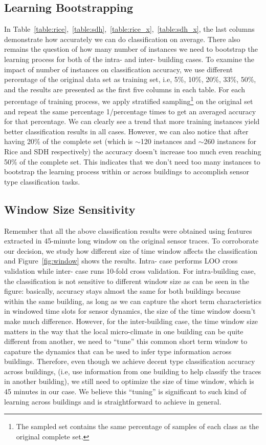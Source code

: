 \subsection{Learning Bootstrapping}
In Table~\ref{table:rice},~\ref{table:sdh},~\ref{table:rice_x},~\ref{table:sdh_x}, the last columns demonstrate how accurately we can do classification on average. There also remains the question of how many number of instances we need to bootstrap the learning process for both of the intra- and inter- building cases. To examine the impact of number of instances on classification accuracy, we use different percentage of the original data set as training set, i.e, 5\%, 10\%, 20\%, 33\%,
50\%, and the results are presented as the first five columns in each table. For each percentage of training process, we apply stratified sampling\footnote{The sampled set contains the same percentage of samples of each class as the original complete set.} on the original set and repeat the same percentage 1/percentage times to get an averaged accuracy for that percentage. We can clearly see a trend that more
training instances yield better classification results in all cases. However, we can also notice that after having 20\% of the complete set (which is $\sim$120 instances and $\sim$260 instances for Rice and SDH respectively) the accuracy doesn't increase too much even reaching 50\% of the complete set. This indicates that we don't need too many instances to bootstrap the learning process within or across buildings to accomplish sensor type classification tasks.

\subsection{Window Size Sensitivity}
Remember that all the above classification results were obtained using features extracted in 45-minute long window on the original sensor traces. To corroborate our decision, we study how different size of time window affects the classification and Figure~\ref{fig:window} shows the results. Intra- case performs LOO cross validation while inter- case runs 10-fold cross validation. For intra-building case, the classification is not sensitive to different window size as can be seen in the figure: basically, accuracy stays almost the same for both buildings because within the same building, as long as we can capture the short term characteristics in windowed time slots for sensor dynamics, the size of the time window doesn't make much difference. However, for the inter-building case, the time window size matters in the way that the local micro-climate in one building can be quite different from another, we need to ``tune'' this common short term window to capature the dynamics that can be used to infer type information across buildings. Therefore, even though we achieve decent type classification accuracy across buildings, (i.e, use information from one building to help classify the traces in another building), we still need to optimize the size of time window, which is 45 minutes in our case. We believe this ``tuning'' is significant to such kind of learning across buildings and is straightforward to achieve in general.

